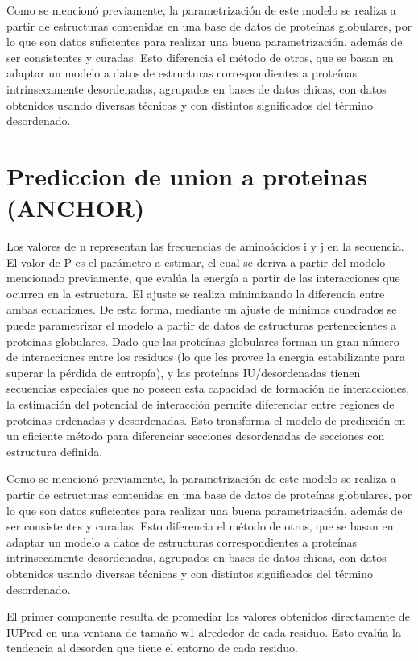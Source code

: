 Como se mencionó previamente, la parametrización de este modelo se realiza a partir de estructuras contenidas en una base de datos de proteínas globulares, 
por lo que son datos suficientes para realizar una buena parametrización, además de ser consistentes y curadas. Esto diferencia el método de otros, que se basan en adaptar 
un modelo a datos de estructuras correspondientes a proteínas intrínsecamente desordenadas, agrupados en bases de datos chicas, con datos obtenidos usando diversas técnicas 
y con distintos significados del término desordenado.
  

  
  
\section{Prediccion de union a proteinas (ANCHOR)}
Los valores de n representan las frecuencias de aminoácidos i y j en la secuencia.
El valor de P es el parámetro a estimar, el cual se deriva a partir del modelo mencionado previamente, que evalúa la energía a partir de las interacciones que ocurren en la estructura. 
El ajuste se realiza minimizando la diferencia entre ambas ecuaciones.
De esta forma, mediante un ajuste de mínimos cuadrados se puede parametrizar el modelo a partir de datos de estructuras pertenecientes a proteínas globulares.
Dado que las proteínas globulares forman un gran número de interacciones entre los residuos (lo que les provee la energía estabilizante para superar la pérdida de entropía), 
y las proteínas IU/desordenadas tienen secuencias especiales que no poseen esta capacidad de formación de interacciones, la estimación del potencial de interacción permite diferenciar entre
regiones de proteínas ordenadas y desordenadas. Esto transforma el modelo de predicción en un eficiente método para diferenciar secciones desordenadas de secciones con estructura definida.

Como se mencionó previamente, la parametrización de este modelo se realiza a partir de estructuras contenidas en una base de datos de proteínas globulares, por lo que son datos suficientes
para realizar una buena parametrización, además de ser consistentes y curadas. Esto diferencia el método de otros, que se basan en adaptar un modelo a datos de estructuras correspondientes
a proteínas intrínsecamente desordenadas, agrupados en bases de datos chicas, con datos obtenidos usando diversas técnicas y con distintos significados del término desordenado.

El primer componente resulta de promediar los valores obtenidos directamente de IUPred en una ventana de tamaño w1 alrededor de cada residuo. Esto evalúa la tendencia al desorden
que tiene el entorno de cada residuo.

